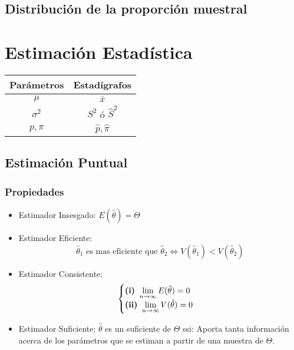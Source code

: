 \documentclass[10pt,letterpaper]{article}
\begin{document}
\subsection{Distribución de la proporción muestral}
\section{Estimación Estadística}
\begin{center}
 \begin{tabular}{|c|c|}
\hline 
Parámetros & Estadígrafos \\ 
\hline 
$\mu$ & $\bar{x}$ \\ 
$\sigma^2$ & $S^2$ ó $\hat{S}^2$ \\
$p,\pi$ & $\hat{p},\hat{\pi}$\\
\hline 
\end{tabular}
 \end{center} 
\subsection{Estimación Puntual}
\subsubsection{Propiedades}
\begin{itemize}
\item Estimador Insesgado: $E(\hat{\theta}) = \Theta$
\item Estimador Eficiente: 
$$\hat{\theta}_1 \text{ es mas eficiente que } \hat{\theta}_2 \Leftrightarrow V(\hat{\theta}_1) < V(\hat{\theta}_2)$$
\item Estimador Consistente: 
$$
\begin{cases}
\text{\textbf{(i) }} \displaystyle\lim_{n\to\infty} E(\hat{\theta})=0 \\
\text{\textbf{(ii) }} \displaystyle\lim_{n\to\infty} V(\hat{\theta})=0 \\
\end{cases}
$$
\item Estimador Suficiente: $\hat{\theta}$ es un suficiente de $\Theta$ ssi: Aporta tanta información acerca de los parámetros que se estiman a partir de una muestra de $\Theta$.
\end{itemize}
\end{document}
